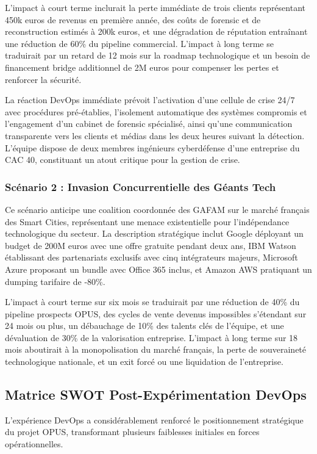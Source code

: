 \documentclass[12pt,a4paper]{article}
\begin{document}
L'impact à court terme inclurait la perte immédiate de trois clients représentant 450k euros de revenus en première année, des coûts de forensic et de reconstruction estimés à 200k euros, et une dégradation de réputation entraînant une réduction de 60\% du pipeline commercial. L'impact à long terme se traduirait par un retard de 12 mois sur la roadmap technologique et un besoin de financement bridge additionnel de 2M euros pour compenser les pertes et renforcer la sécurité.

La réaction DevOps immédiate prévoit l'activation d'une cellule de crise 24/7 avec procédures pré-établies, l'isolement automatique des systèmes compromis et l'engagement d'un cabinet de forensic spécialisé, ainsi qu'une communication transparente vers les clients et médias dans les deux heures suivant la détection. L'équipe dispose de deux membres ingénieurs cyberdéfense d'une entreprise du CAC 40, constituant un atout critique pour la gestion de crise.

\subsubsection{Scénario 2 : Invasion Concurrentielle des Géants Tech}

Ce scénario anticipe une coalition coordonnée des GAFAM sur le marché français des Smart Cities, représentant une menace existentielle pour l'indépendance technologique du secteur. La description stratégique inclut Google déployant un budget de 200M euros avec une offre gratuite pendant deux ans, IBM Watson établissant des partenariats exclusifs avec cinq intégrateurs majeurs, Microsoft Azure proposant un bundle avec Office 365 inclus, et Amazon AWS pratiquant un dumping tarifaire de -80\%.

L'impact à court terme sur six mois se traduirait par une réduction de 40\% du pipeline prospects OPUS, des cycles de vente devenus impossibles s'étendant sur 24 mois ou plus, un débauchage de 10\% des talents clés de l'équipe, et une dévaluation de 30\% de la valorisation entreprise. L'impact à long terme sur 18 mois aboutirait à la monopolisation du marché français, la perte de souveraineté technologique nationale, et un exit forcé ou une liquidation de l'entreprise.

\subsection{Matrice SWOT Post-Expérimentation DevOps}

L'expérience DevOps a considérablement renforcé le positionnement stratégique du projet OPUS, transformant plusieurs faiblesses initiales en forces opérationnelles.
\end{document}
